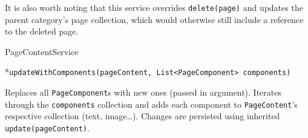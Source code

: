 \enditems

It is also worth noting that this service overrides {\tt delete(page)} and updates the parent category’s page collection, which would otherwise still include a reference to the deleted page.

\secc PageContentService

\begitems

*{\tt updateWithComponents(pageContent, List<PageComponent> components)}

Replaces all {\tt PageComponent}s with new ones (passed in argument). Iterates through the {\tt components} collection and adds each component to {\tt PageContent}’s respective collection (text, image…). Changes are persisted using inherited {\tt update(pageContent)}.

\enditems


